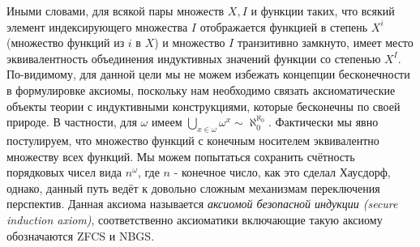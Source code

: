 \documentclass[12pt]{article}
\begin{document}
Иными словами, для всякой пары множеств $X, I$ и функции таких, что всякий элемент индексирующего множества $I$ отображается функцией в степень $X^i$ (множество функций из $i$ в $X$) и множество $I$ транзитивно замкнуто, имеет место эквивалентность объединения индуктивных значений функции со степенью $X^I$. По-видимому, для данной цели мы не можем избежать концепции бесконечности в формулировке аксиомы, поскольку нам необходимо связать аксиоматические объекты теории с индуктивными конструкциями, которые бесконечны по своей природе. В частности, для $\omega$ имеем $\bigcup_{x \in \omega} \omega^x \sim \aleph_0^{\aleph_0}$. Фактически мы явно постулируем, что множество функций с конечным носителем эквивалентно множеству всех функций. Мы можем попытаться сохранить счётность порядковых чисел вида $n^{\omega}$, где $n$ - конечное число, как это сделал Хаусдорф, однако, данный путь ведёт к довольно сложным механизмам переключения перспектив. Данная аксиома называется {\it аксиомой безопасной индукции (secure induction axiom)}, соответственно аксиоматики включающие такую аксиому обозначаются ZFCS и NBGS. 
\end{document}
